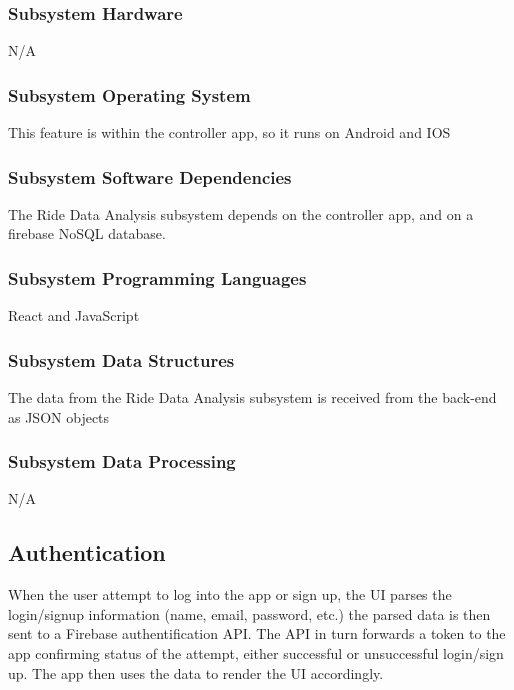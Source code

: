 \subsubsection{Subsystem Hardware}
N/A

\subsubsection{Subsystem Operating System}
This feature is within the controller app, so it runs on Android and IOS

\subsubsection{Subsystem Software Dependencies}
The Ride Data Analysis subsystem depends on the controller app, and on a firebase NoSQL database.

\subsubsection{Subsystem Programming Languages}
React and JavaScript 

\subsubsection{Subsystem Data Structures}
The data from the Ride Data Analysis subsystem is received from the back-end as JSON objects

\subsubsection{Subsystem Data Processing}
N/A

\subsection{Authentication}
When the user attempt to log into the app or sign up, the UI parses the login/signup information (name, email, password, etc.) the parsed data is then sent to a Firebase authentification API. The API in turn forwards a token to the app confirming status of the attempt, either successful or unsuccessful login/sign up. The app then uses the data to render the UI accordingly.

